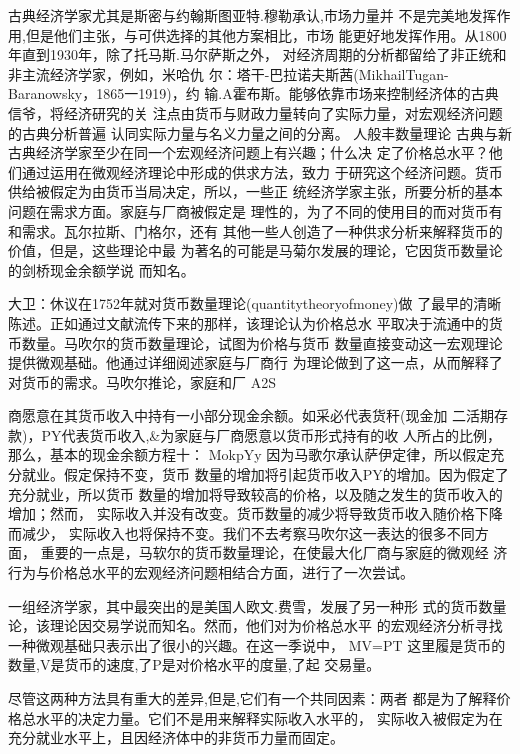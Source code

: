 古典经济学家尤其是斯密与约翰斯图亚特.穆勒承认,市场力量并
不是完美地发挥作用,但是他们主张，与可供选择的其他方案相比，市场
能更好地发挥作用。从1800年直到1930年，除了托马斯.马尔萨斯之外，
对经济周期的分析都留给了非正统和非主流经济学家，例如，米哈仇
尔：塔干-巴拉诺夫斯茜(MikhailTugan-Baranowsky，1865一1919)，约
输.A霍布斯。能够依靠市场来控制经济体的古典信爷，将经济研究的关
注点由货币与财政力量转向了实际力量，对宏观经济问题的古典分析普遍
认同实际力量与名义力量之间的分离。
人般丰数量理论
古典与新古典经济学家至少在同一个宏观经济问题上有兴趣；什么决
定了价格总水平？他们通过运用在微观经济理论中形成的供求方法，致力
于研究这个经济问题。货币供给被假定为由货币当局决定，所以，一些正
统经济学家主张，所要分析的基本问题在需求方面。家庭与厂商被假定是
理性的，为了不同的使用目的而对货币有和需求。瓦尔拉斯、门格尔，还有
其他一些人创造了一种供求分析来解释货币的价值，但是，这些理论中最
为著名的可能是马菊尔发展的理论，它因货币数量论的剑桥现金余额学说
而知名。

大卫：休议在1752年就对货币数量理论(quantitytheoryofmoney)做
了最早的清晰陈述。正如通过文献流传下来的那样，该理论认为价格总水
平取决于流通中的货币数量。马吹尔的货币数量理论，试图为价格与货币
数量直接变动这一宏观理论提供微观基础。他通过详细阅述家庭与厂商行
为理论做到了这一点，从而解释了对货币的需求。马吹尔推论，家庭和厂
A2S



商愿意在其货币收入中持有一小部分现金余额。如采必代表货秆(现金加
二活期存款)，PY代表货币收入,&为家庭与厂商愿意以货币形式持有的收
人所占的比例，那么，基本的现金余额方程十：
MokpYy
因为马歌尔承认萨伊定律，所以假定充分就业。假定保持不变，货币
数量的增加将引起货币收入PY的增加。因为假定了充分就业，所以货币
数量的增加将导致较高的价格，以及随之发生的货币收入的增加；然而，
实际收入并没有改变。货币数量的减少将导致货币收入随价格下降而减少，
实际收入也将保持不变。我们不去考察马吹尔这一表达的很多不同方面，
重要的一点是，马软尔的货币数量理论，在使最大化厂商与家庭的微观经
济行为与价格总水平的宏观经济问题相结合方面，进行了一次尝试。

一组经济学家，其中最突出的是美国人欧文.费雪，发展了另一种形
式的货币数量论，该理论因交易学说而知名。然而，他们对为价格总水平
的宏观经济分析寻找一种微观基础只表示出了很小的兴趣。在这一季说中，
MV=PT
这里履是货币的数量,V是货币的速度,了P是对价格水平的度量,了起
交易量。

尽管这两种方法具有重大的差异,但是,它们有一个共同因素：两者
都是为了解释价格总水平的决定力量。它们不是用来解释实际收入水平的，
实际收入被假定为在充分就业水平上，且因经济体中的非货币力量而固定。

